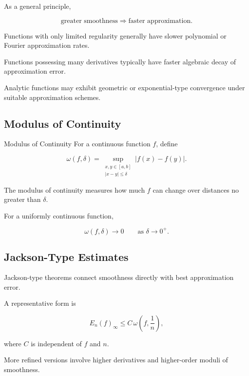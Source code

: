 As a general principle,

\[
\boxed{
\text{greater smoothness}
\Longrightarrow
\text{faster approximation}.
}
\]

Functions with only limited regularity generally have slower polynomial
or Fourier approximation rates.

Functions possessing many derivatives typically have faster algebraic
decay of approximation error.

Analytic functions may exhibit geometric or exponential-type convergence
under suitable approximation schemes.

\subsection{Modulus of Continuity}
\label{subsec:modulus-of-continuity}

\begin{definitionbox}{Modulus of Continuity}
For a continuous function \(f\), define

\[
\boxed{
\omega(f,\delta)
=
\sup_{\substack{x,y\in[a,b]\\|x-y|\leq\delta}}
|f(x)-f(y)|.
}
\]
\end{definitionbox}

The modulus of continuity measures how much \(f\) can change over
distances no greater than \(\delta\).

For a uniformly continuous function,

\[
\boxed{
\omega(f,\delta)\to0
\qquad
\text{as }\delta\to0^+.
}
\]

\subsection{Jackson-Type Estimates}
\label{subsec:jackson-estimates}

Jackson-type theorems connect smoothness directly with best approximation
error.

A representative form is

\[
\boxed{
E_n(f)_\infty
\leq
C\,
\omega
\left(
f,\frac{1}{n}
\right),
}
\]

where \(C\) is independent of \(f\) and \(n\).

More refined versions involve higher derivatives and higher-order moduli
of smoothness.

